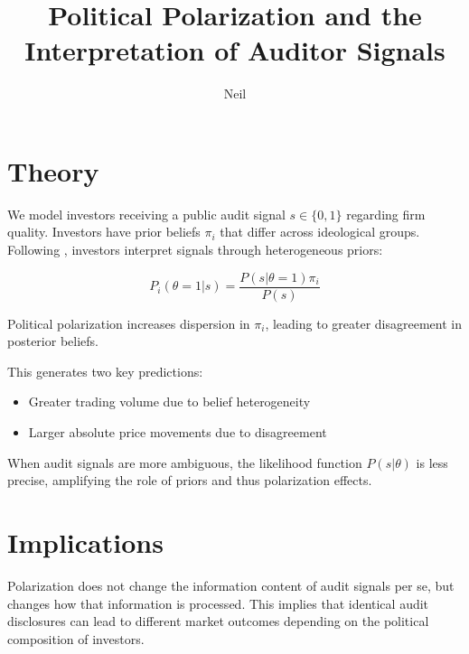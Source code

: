 \documentclass[12pt]{article}
\title{Political Polarization and the Interpretation of Auditor Signals}
\author{Neil}
\date{}
\begin{document}
\maketitle
\onehalfspacing

\section{Theory}

We model investors receiving a public audit signal $s \in \{0,1\}$ regarding firm quality. Investors have prior beliefs $\pi_i$ that differ across ideological groups. Following \citet{kandel1995}, investors interpret signals through heterogeneous priors:

\begin{equation}
P_i(\theta=1|s) = \frac{P(s|\theta=1)\pi_i}{P(s)}
\end{equation}

Political polarization increases dispersion in $\pi_i$, leading to greater disagreement in posterior beliefs.

This generates two key predictions:

\begin{itemize}
\item Greater trading volume due to belief heterogeneity
\item Larger absolute price movements due to disagreement
\end{itemize}

When audit signals are more ambiguous, the likelihood function $P(s|\theta)$ is less precise, amplifying the role of priors and thus polarization effects.

\section{Implications}

Polarization does not change the information content of audit signals per se, but changes how that information is processed. This implies that identical audit disclosures can lead to different market outcomes depending on the political composition of investors.



\end{document}
